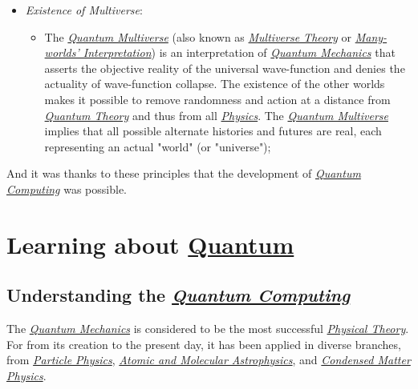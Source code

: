 \documentclass[conference]{IEEEtran}
\begin{document}
\begin{itemize}
  \item \textit{Existence of Multiverse}:
    \begin{itemize}
        \item The \href{https://en.wikipedia.org/wiki/Many-worlds_interpretation}{\textit{Quantum Multiverse}} (also known as \href{https://en.wikipedia.org/wiki/Many-worlds_interpretation}{\textit{Multiverse Theory}} or \href{https://en.wikipedia.org/wiki/Many-worlds_interpretation}{\textit{Many-worlds' Interpretation}}) is an interpretation of \href{https://en.wikipedia.org/wiki/Quantum_mechanics}{\textit{Quantum Mechanics}} that asserts the objective reality of the universal wave-function and denies the actuality of wave-function collapse. The existence of the other worlds makes it possible to remove randomness and action at a distance from \href{https://en.wikipedia.org/wiki/Quantum_theory}{\textit{Quantum Theory}} and thus from all \href{https://en.wikipedia.org/wiki/Physics}{\textit{Physics}}. The \href{https://en.wikipedia.org/wiki/Many-worlds_interpretation}{\textit{Quantum Multiverse}} implies that all possible alternate histories and futures are real, each representing an actual "world" (or "universe");
    \end{itemize}
\end{itemize}

\vspace{6pt}

And it was thanks to these principles that the development of \href{https://en.wikipedia.org/wiki/Quantum_computing}{\textit{Quantum Computing}} was possible.

\vspace{6pt}

\section{Learning about \href{https://en.wikipedia.org/wiki/Quantum}{Quantum}}

\subsection{Understanding the \href{https://en.wikipedia.org/wiki/Quantum_computing}{\textit{Quantum Computing}}}\label{AA}

The \href{https://en.wikipedia.org/wiki/Quantum_mechanics}{\textit{Quantum Mechanics}} is considered to be the most successful \href{https://en.wikipedia.org/wiki/Theoretical_physics}{\textit{Physical Theory}}. For from its creation to the present day, it has been applied in diverse branches, from \href{https://en.wikipedia.org/wiki/Particle_physics}{\textit{Particle Physics}}, \href{https://en.wikipedia.org/wiki/Atomic_and_molecular_astrophysics}{\textit{Atomic and Molecular Astrophysics}}, and \href{https://en.wikipedia.org/wiki/Condensed_matter_physics}{\textit{Condensed Matter Physics}}.
\end{document}
